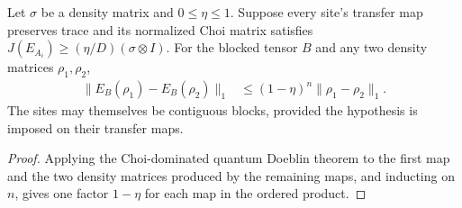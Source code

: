 \begin{lemma}
    \label{thm:ldp_chain_doeblin}
    \leanok
    Let $\sigma$ be a density matrix and $0\le\eta\le1$. Suppose every
    site's transfer map preserves trace and its normalized Choi matrix
    satisfies $J(E_{A_i})\ge(\eta/D)(\sigma\otimes I)$. For the blocked
    tensor $B$ and any two density matrices $\rho_1,\rho_2$,
    \begin{align}
        \lVert E_B(\rho_1)-E_B(\rho_2)\rVert_1
         & \le(1-\eta)^n\lVert\rho_1-\rho_2\rVert_1.
    \end{align}
    The sites may themselves be contiguous blocks, provided the hypothesis
    is imposed on their transfer maps.
\end{lemma}
\begin{proof}\leanok
    Applying the Choi-dominated quantum Doeblin theorem to the first map and
    the two density matrices produced by the remaining maps, and inducting on
    $n$, gives one factor $1-\eta$ for each map in the ordered product.
\end{proof}


